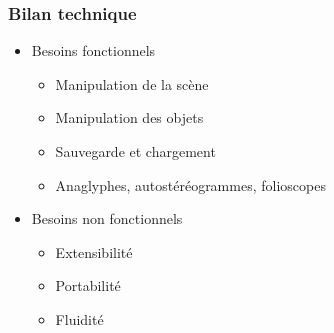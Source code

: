 \documentclass{beamer}
\begin{document}
\begin{frame}
\frametitle{Bilan technique}
\begin{itemize}[label=$\bullet$]
\item Besoins fonctionnels
	\begin{itemize}[label=$\checkmark$]
	\item Manipulation de la scène
	\item Manipulation des objets
	\item Sauvegarde et chargement
	\item Anaglyphes, autostéréogrammes, folioscopes
	\end{itemize}
\item Besoins non fonctionnels
	\begin{itemize}[label=$\checkmark$]
	\item Extensibilité
	\item Portabilité  
	\item Fluidité %
	\end{itemize}
\end{itemize}

\end{frame}

\end{document}
